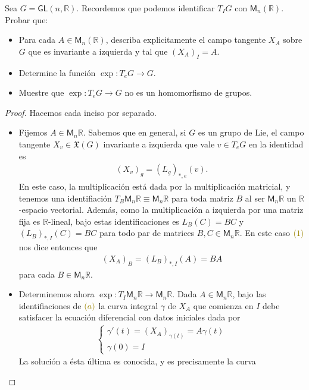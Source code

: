 \documentclass[11pt]{article}
\newcommand{\R}{\mathbb{R}}
\newcommand{\paint}[1]{\color{color}{#1}}
\newenvironment{exercise}[2][Ejercicio]{\begin{trivlist}
\item[\hskip \labelsep \paint{{\bfseries #1}}\hskip \labelsep {\bfseries #2.}]}{\end{trivlist}}
\begin{document}
\begin{exercise}{10} Sea $G=\mathsf{GL}(n,\R)$. Recordemos que podemos identificar $T_IG$
con $\mathsf{M}_n(\R)$. Probar que:
\begin{itemize}
\item[a)] Para cada $A\in \mathsf{M}_n(\R)$, describa explicitamente el campo tangente
$X_A$ sobre $G$ que es invariante a izquierda y tal que $(X_A)_I=A$.
\item[b)] Determine la funci\'on $\exp:T_eG\to G$.
\item[c)] Muestre que $\exp:T_eG\to G$ no es un homomorfismo de grupos.
\end{itemize}
\end{exercise}
\begin{proof} Hacemos cada inciso por separado.
\begin{itemize}
\item[a)] Fijemos $A \in \mathsf{M}_n\R$. Sabemos que en general, si $G$ es un grupo de Lie, el campo tangente $X_v \in \mathfrak{X}(G)$ invariante a izquierda que vale $v \in T_eG$ en la identidad es
\begin{align}
(X_v)_g = (L_g)_{\ast,e}(v).
\end{align}
En este caso, la multiplicaci\'on est\'a dada por la multiplicaci\'on matricial, y tenemos una identifiaci\'on $T_B\mathsf{M}_n\R \equiv \mathsf{M}_n\R$ para toda matriz $B$ al ser $\mathsf{M}_n\R$ un $\R$-espacio vectorial. Adem\'as, como la multiplicaci\'on a izquierda por una matriz fija es $\R$-lineal, bajo estas identificaciones es $L_B(C) = BC$ y $(L_B)_{\ast,I}(C) = BC$ para todo par de matrices $B,C \in \mathsf{M}_n\R$. En este caso $\paint{(1)}$ nos dice entonces que
\begin{align*}
(X_A)_B = (L_B)_{\ast,I}(A) = BA
\end{align*}
para cada $B \in \mathsf{M}_n\R$.
\item[b)] Determinemos ahora $\exp: T_I\mathsf{M}_n\R \to \mathsf{M}_n\R$. Dada $A \in \mathsf{M}_n\R$, bajo las identifiaciones de $\paint{(a)}$ la curva integral $\gamma$ de $X_A$ que comienza en $I$ debe satisfacer la ecuaci\'on diferencial con datos iniciales dada por
\begin{align}
\begin{cases}
\gamma'(t) = (X_A)_{\gamma(t)} = A\gamma(t)\\
\gamma(0) = I
\end{cases}
\end{align}
La soluci\'on a \'esta \'ultima es conocida, y es precisamente la curva

\end{itemize}
\end{proof}
\end{document}
